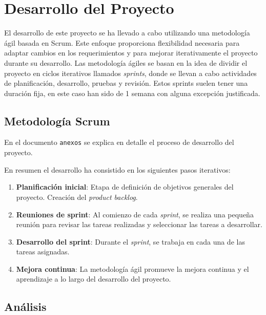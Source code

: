 
\section{Desarrollo del Proyecto}

El desarrollo de este proyecto se ha llevado a cabo utilizando una metodología ágil basada en Scrum. Este enfoque proporciona flexibilidad necesaria para adaptar cambios en los requerimientos y para mejorar iterativamente el proyecto durante su desarrollo.
Las metodología ágiles se basan en la idea de dividir el proyecto en ciclos iterativos llamados \textit{sprints}, donde se llevan a cabo actividades de planificación, desarrollo, pruebas y revisión. 
Estos sprints suelen tener una duración fija, en este caso han sido de 1 semana con alguna excepción justificada.

\subsection{Metodología Scrum}
En el documento \texttt{anexos} se explica en detalle el proceso de desarrollo del proyecto.

En resumen el desarrollo ha consistido en los siguientes pasos iterativos:

\begin{enumerate}
\item \textbf{Planificación inicial}: Etapa de definición de objetivos generales del proyecto. Creación del \textit{product backlog}.

\item \textbf{Reuniones de sprint}: Al comienzo de cada \textit{sprint}, se realiza una pequeña reunión para revisar las tareas realizadas y seleccionar las tareas a desarrollar.

\item \textbf{Desarrollo del sprint}: Durante el \textit{sprint}, se trabaja en cada una de las tareas asignadas.

\item \textbf{Mejora continua}: La metodología ágil promueve la mejora continua y el aprendizaje a lo largo del desarrollo del proyecto.
\end{enumerate}

\subsection{Análisis}

